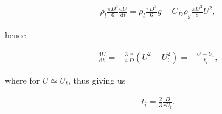 \begin{align}
	\rho_l \frac{\pi D^3}6 \frac{\textrm{d}U}{\textrm{d}t} =  \rho_l \frac{\pi D^3}6 g - C_D \rho_g \frac{\pi D^2} 8  U^2, \label{borda}
\end{align}

hence

\begin{align}
\frac{\textrm{d}U}{\textrm{d}t}  = -  \frac 34 \frac {r}{D} (U^2 - U_t^2) = -\frac{U-U_t}{t_i}, \label{dtu}
\end{align}

where for $U \simeq U_t$, thus giving us 

\begin{align}
t_i =  \frac 23 \frac {D}{r U_t}.
\end{align}

